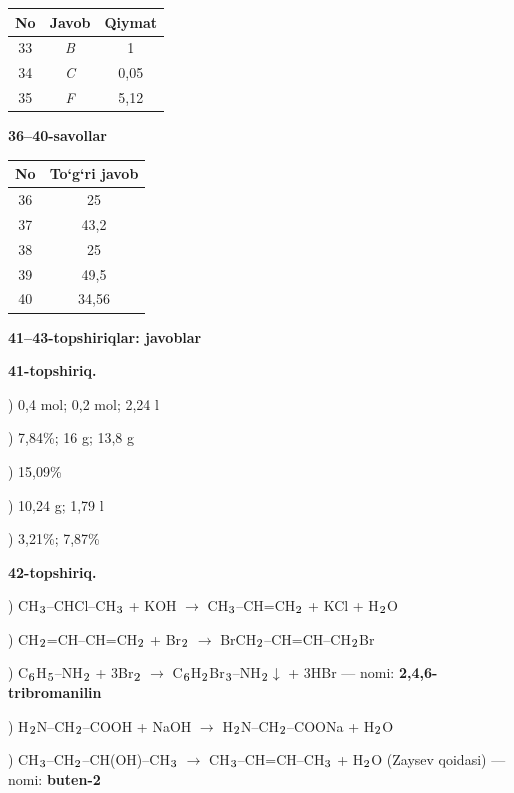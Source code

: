 \documentclass[11pt,a4paper]{article}
\renewcommand{\textsubscript}[1]{\ensuremath{_{\text{\fontsize{8}{8}\selectfont #1}}}}
\begin{document}
\noindent\begin{tabular}{|c|c|c|}\hline \textbf{No} & \textbf{Javob} & \textbf{Qiymat}\\\hline
33 & \textsl{B} & 1\\\hline
34 & \textsl{C} & 0,05\\\hline
35 & \textsl{F} & 5,12\\\hline
\end{tabular}\par\medskip
\noindent\textbf{36--40-savollar}\par\smallskip
\noindent\begin{tabular}{|c|c|}\hline \textbf{No} & \textbf{To`g`ri javob}\\\hline
36 & 25\\\hline
37 & 43,2\\\hline
38 & 25\\\hline
39 & 49,5\\\hline
40 & 34,56\\\hline
\end{tabular}\par\medskip
\noindent\textbf{41--43-topshiriqlar: javoblar}\par\smallskip
\noindent\textbf{41-topshiriq.}\par
{}) 0,4 mol; 0,2 mol; 2,24 l\par
{}) 7,84\%; 16 g; 13,8 g\par
{}) 15,09\%\par
{}) 10,24 g; 1,79 l\par
{}) 3,21\%; 7,87\%\par
\noindent\textbf{42-topshiriq.}\par
{}) CH\textsubscript{3}--CHCl--CH\textsubscript{3} + KOH $\to$ CH\textsubscript{3}--CH=CH\textsubscript{2} + KCl + H\textsubscript{2}O\par
{}) CH\textsubscript{2}=CH--CH=CH\textsubscript{2} + Br\textsubscript{2} $\to$ BrCH\textsubscript{2}--CH=CH--CH\textsubscript{2}Br\par
{}) C\textsubscript{6}H\textsubscript{5}--NH\textsubscript{2} + 3Br\textsubscript{2} $\to$ C\textsubscript{6}H\textsubscript{2}Br\textsubscript{3}--NH\textsubscript{2}$\downarrow$ + 3HBr --- nomi: \textbf{2,4,6-tribromanilin}\par
{}) H\textsubscript{2}N--CH\textsubscript{2}--COOH + NaOH $\to$ H\textsubscript{2}N--CH\textsubscript{2}--COONa + H\textsubscript{2}O\par
{}) CH\textsubscript{3}--CH\textsubscript{2}--CH(OH)--CH\textsubscript{3} $\to$ CH\textsubscript{3}--CH=CH--CH\textsubscript{3} + H\textsubscript{2}O (Zaysev qoidasi) --- nomi: \textbf{buten-2}\par
\end{document}

